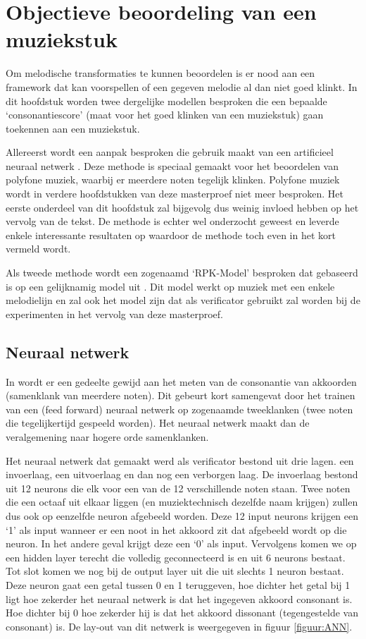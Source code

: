 \chapter{Objectieve beoordeling van een muziekstuk}
\label{hoofdstuk:OBM}
Om melodische transformaties te kunnen beoordelen is er nood aan een framework dat kan voorspellen of een gegeven melodie al dan niet goed klinkt. In dit hoofdstuk worden twee dergelijke modellen besproken die een bepaalde `consonantiescore' (maat voor het goed klinken van een muziekstuk) gaan toekennen aan een muziekstuk. 

Allereerst wordt een aanpak besproken die gebruik maakt van een artificieel neuraal netwerk \cite{book:ANN}. Deze methode is speciaal gemaakt voor het beoordelen van polyfone muziek, waarbij er meerdere noten tegelijk klinken. Polyfone muziek wordt in verdere hoofdstukken van deze masterproef niet meer besproken. Het eerste onderdeel van dit hoofdstuk zal bijgevolg dus weinig invloed hebben op het vervolg van de tekst. De methode is echter wel onderzocht geweest en leverde enkele interessante resultaten op waardoor de methode toch even in het kort vermeld wordt. 

Als tweede methode wordt een zogenaamd `RPK-Model' besproken dat gebaseerd is op een gelijknamig model uit \cite{book:musicAndProbability}. Dit model werkt op muziek met een enkele melodielijn en zal ook het model zijn dat als verificator gebruikt zal worden bij de experimenten in het vervolg van deze masterproef.

\section{Neuraal netwerk}
\label{OBM:NN}
In \cite{book:musimathics} wordt er een gedeelte gewijd aan het meten van de consonantie van akkoorden (samenklank van meerdere noten). Dit gebeurt kort samengevat door het trainen van een (feed forward) neuraal netwerk\cite{url:FFNN} op zogenaamde tweeklanken (twee noten die tegelijkertijd gespeeld worden). Het neuraal netwerk maakt dan de veralgemening naar hogere orde samenklanken. 

Het neuraal netwerk dat gemaakt werd als verificator bestond uit drie lagen. een invoerlaag, een uitvoerlaag en dan nog een verborgen laag. De invoerlaag bestond uit 12 neurons die elk voor een van de 12 verschillende noten staan. Twee noten die een octaaf uit elkaar liggen (en muziektechnisch dezelfde naam krijgen) zullen dus ook op eenzelfde neuron afgebeeld worden. Deze 12 input neurons krijgen een `1' als input wanneer er een noot in het akkoord zit dat afgebeeld wordt op die neuron. In het andere geval krijgt deze een `0' als input. Vervolgens komen we op een hidden layer terecht die volledig geconnecteerd is en uit 6 neurons bestaat. Tot slot komen we nog bij de output layer uit die uit slechts 1 neuron bestaat. Deze neuron gaat een getal tussen 0 en 1 teruggeven, hoe dichter het getal bij 1 ligt hoe zekerder het neuraal netwerk is dat het ingegeven akkoord consonant is. Hoe dichter bij 0 hoe zekerder hij is dat het akkoord dissonant (tegengestelde van consonant) is. De lay-out van dit netwerk is weergegeven in figuur \ref{figuur:ANN}.\\

